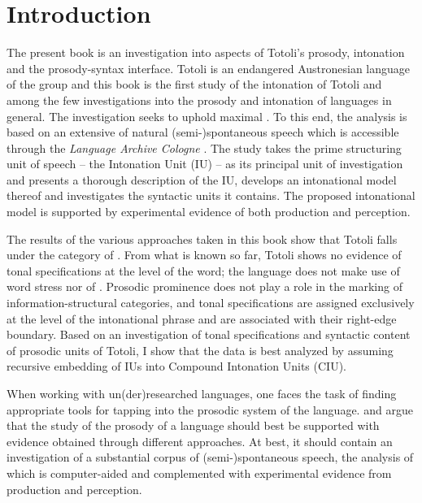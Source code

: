 \chapter{Introduction}
\label{Guide}



The present book is an investigation into aspects of Totoli's prosody, intonation and the prosody-syntax interface. Totoli is an endangered Austronesian language of the  group and this book is the first study of the intonation of Totoli and among the few investigations into the prosody and intonation of  languages in general. The investigation seeks to  uphold maximal  \citep{Cicourel2007}. To this end, the analysis is based on an extensive  of natural (semi-)spontaneous speech which is accessible through the \textit{Language Archive Cologne} \citep{TotoliLAC}. The study takes the prime structuring unit of speech -- the Intonation Unit (IU) -- as its principal unit of investigation and presents a thorough description of the IU, develops an intonational model thereof and investigates the syntactic units it contains. The proposed intonational model  is supported by experimental evidence of both production and perception. 




The results of the various approaches  taken in this book show that Totoli falls under the category of  \citep{Fery_2016}. From what is known so far, Totoli shows no evidence of tonal specifications at the level of the word; the language does not make use of word stress nor of . Prosodic prominence  does not play a role in the marking of information-structural  categories, and tonal specifications are assigned exclusively at the level of the intonational phrase and are associated with their right-edge boundary. Based on an investigation of tonal specifications and syntactic content of prosodic units of Totoli, I show that the data is best analyzed by assuming recursive embedding  of IUs into Compound Intonation Units  (CIU). 


When working with un(der)researched languages,  one faces the task of finding appropriate tools for tapping into the prosodic system of the language. \citet{himmelmann2006challenges} and \citet{himmelmann2008prosodic} argue that  the study of the prosody of a language should best be supported with evidence obtained through different approaches. At best, it should contain an investigation of a substantial corpus of \mbox{(semi-)}spontaneous speech, the analysis of which  is computer-aided and complemented with experimental evidence from production and perception. 


